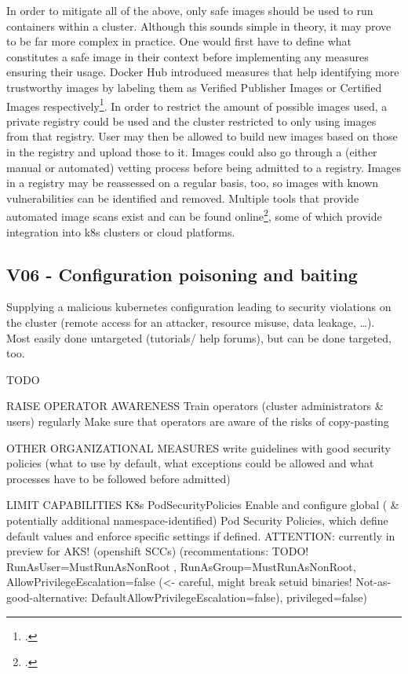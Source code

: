 In order to mitigate all of the above, only safe images should be used to run containers within a cluster. Although this sounds simple in theory, it may prove to be far more complex in practice.  One would first have to define what constitutes a safe image in their context before implementing any measures ensuring their usage.
Docker Hub introduced measures that help identifying more trustworthy images by labeling them as Verified Publisher Images or Certified Images respectively\footcite[][, sections 'Verified Publisher Images and Plugins' and 'Certified Images and Plugins']{safeImagesDockerhub}.
In order to restrict the amount of possible images used, a private registry could be used and the cluster restricted to only using images from that registry. User may then be allowed to build new images based on those in the registry and upload those to it. 
Images could also go through a (either manual or automated) vetting process before being admitted to a registry. Images in a registry may be reassessed on a regular basis, too, so images with known vulnerabilities can be identified and removed. Multiple tools that provide automated image scans exist and can be found online\footcite[][, section 'Securing your container images']{k8sBookWebsite}, some of which provide integration into \gls{k8s} clusters or cloud platforms.

\subsection{V06 - Configuration poisoning and baiting}
Supplying a malicious kubernetes configuration leading to security violations on the cluster (remote access for an attacker, resource misuse, data leakage, …). Most easily done untargeted (tutorials/ help forums), but can be done targeted, too.

TODO

RAISE OPERATOR AWARENESS
	Train operators (cluster administrators \& users) regularly									
	Make sure that operators are aware of the risks of copy-pasting									
										
OTHER ORGANIZATIONAL MEASURES
	write guidelines with good security policies (what to use by default, what exceptions could be allowed and what processes have to be followed before admitted)	

LIMIT CAPABILITIES
	K8s PodSecurityPolicies			Enable and configure global ( \& potentially additional namespace-identified) Pod Security Policies, which define default values and enforce specific settings if defined. ATTENTION: currently in preview for AKS!						
	(openshift SCCs)			(recommentations: TODO! RunAsUser=MustRunAsNonRoot , RunAsGroup=MustRunAsNonRoot, AllowPrivilegeEscalation=false (<- careful, might break setuid binaries! Not-as-good-alternative: DefaultAllowPrivilegeEscalation=false), privileged=false)						
										
